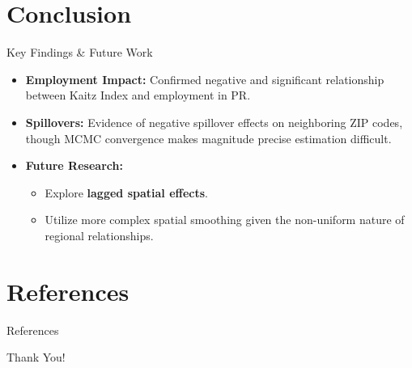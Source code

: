\documentclass[11pt]{beamer}
\begin{document}
\section{Conclusion}

\begin{frame}{Key Findings \& Future Work}
	\begin{itemize}
		\item \textbf{Employment Impact:} Confirmed negative and significant relationship between Kaitz Index and employment in PR.
		\item \textbf{Spillovers:} Evidence of negative spillover effects on neighboring ZIP codes, though MCMC convergence makes magnitude precise estimation difficult.
		\item \textbf{Future Research:}
		      \begin{itemize}
			      \item Explore \textbf{lagged spatial effects}.
			      \item Utilize more complex spatial smoothing given the non-uniform nature of regional relationships.
		      \end{itemize}
	\end{itemize}
\end{frame}

\section{References}
\begin{frame}[allowframebreaks]{References}
	\printbibliography
\end{frame}

\begin{frame}
	\centering
	\Huge Thank You!
\end{frame}
\end{document}
